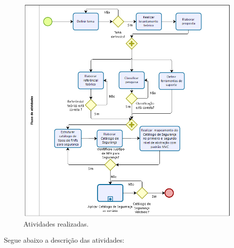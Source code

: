 \begin{figure}[h!]
	\centering
	\includegraphics[keepaspectratio=true,scale=0.7]{figuras/fluxodeatividades.PNG}
	\caption{Atividades realizadas.}
	\label{fluxoDeExecuçãoTCC}
\end{figure}

Segue abaixo a descrição das atividades:


